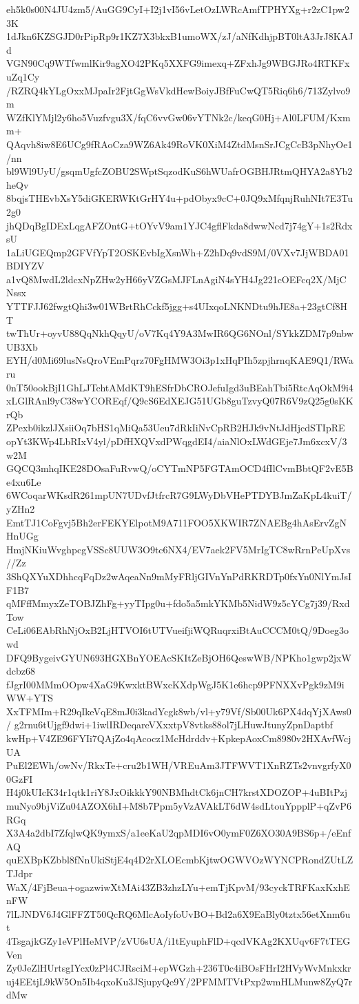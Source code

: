 eh5k0s00N4JU4zm5/AuGG9CyI+I2j1vI56vLetOzLWRcAmfTPHYXg+r2zC1pw23K
1dJkn6KZSGJD0rPipRp9r1KZ7X3bkxB1umoWX/zJ/aNfKdhjpBT0ltA3JrJ8KAJd
VGN90Cq9WTfwmlKir9agXO42PKq5XXFG9imexq+ZFxhJg9WBGJRo4RTKFxuZq1Cy
/RZRQ4kYLgOxxMJpaIr2FjtGgWsVkdHewBoiyJBfFuCwQT5Riq6h6/713Zylvo9m
WZfKlYMjl2y6ho5Vuzfvgu3X/fqC6vvGw06vYTNk2c/keqG0Hj+Al0LFUM/Kxmm+
QAqvh8iw8E6UCg9fRAoCza9WZ6Ak49RoVK0XiM4ZtdMsnSrJCgCcB3pNhyOe1/nn
bl9Wl9UyU/gsqmUgfcZOBU2SWptSqzodKuS6hWUafrOGBHJRtmQHYA2a8Yb2heQv
8bqjsTHEvbXsY5diGKERWKtGrHY4u+pdObyx9cC+0JQ9xMfqnjRuhNIt7E3Tu2g0
jhQDqBgIDExLqgAFZOntG+tOYvV9am1YJC4gflFkda8dwwNcd7j74gY+1s2RdxsU
1aLiUGEQmp2GFVfYpT2OSKEvbIgXsnWh+Z2hDq9vdS9M/0VXv7JjWBDA01BDIYZV
a1vQ8MwdL2ldcxNpZHw2yH66yVZGsMJFLnAgiN4sYH4Jg221cOEFcq2X/MjCNssx
YTTFJJ62fwgtQhi3w01WBrtRhCckf5jgg+s4UIxqoLNKNDtu9hJE8a+23gtCf8HT
twThUr+oyvU88QqNkhQqyU/oV7Kq4Y9A3MwIR6QG6NOnl/SYkkZDM7p9nbwUB3Xb
EYH/d0Mi69lusNsQroVEmPqrz70FgHMW3Oi3p1xHqPIh5zpjhrnqKAE9Q1/RWaru
0nT50ookBjI1GhLJTchtAMdKT9hESfrDbCROJefuIgd3uBEahTbi5RtcAqOkM9i4
xLGlRAnl9yC38wYCOREqf/Q9cS6EdXEJG51UGb8guTzvyQ07R6V9zQ25g0sKKrQb
ZPexb0ikzlJXsiiOq7bHS1qMiQa53Ueu7dRkIiNvCpRB2HJk9vNtJdHjcdSTIpRE
opYt3KWp4LbRIxV4yl/pDfHXQVxdPWqgdEI4/aiaNlOxLWdGEje7Jm6xcxV/3w2M
GQCQ3mhqIKE28DOsaFuRvwQ/oCYTmNP5FGTAmOCD4fIlCvmBbtQF2vE5Be4xu6Le
6WCoqarWKsdR261mpUN7UDvfJtfrcR7G9LWyDbVHePTDYBJmZaKpL4kuiT/yZHn2
EmtTJ1CoFgvj5Bh2erFEKYElpotM9A711FOO5XKWIR7ZNAEBg4hAsErvZgNHnUGg
HmjNKiuWvghpcgVSSc8UUW3O9tc6NX4/EV7aek2FV5MrIgTC8wRrnPeUpXvs//Zz
3ShQXYuXDhhcqFqDz2wAqeaNn9mMyFRljGIVnYnPdRKRDTp0fxYn0NlYmJsIF1B7
qMFffMmyxZeTOBJZhFg+yyTIpg0u+fdo5a5mkYKMb5NidW9z5cYCg7j39/RxdTow
CeLi06EAbRhNjOxB2LjHTVOI6tUTVueifjiWQRuqrxiBtAuCCCM0tQ/9Doeg3owd
DFQ9BygeivGYUN693HGXBnYOEAcSKItZeBjOH6QeswWB/NPKho1gwp2jxWdcbz68
fJgrI00MMmOOpw4XaG9KwxktBWxcKXdpWgJ5K1e6hcp9PFNXXvPgk9zM9iWW+YTS
XxTFMIm+R29qIkeVqE8mJ0i3kadYcgk8wb/vl+y79Vf/Sb00Uk6PX4dqYjXAws0/
g2rnu6tUjgf9dwi+1iwlIRDeqareVXxxtpV8vtks88ol7jLHuwJtunyZpnDaptbf
kwHp+V4ZE96FYIi7QAjZo4qAcocz1McHdrddv+KpkepAoxCm8980v2HXAvfWcjUA
PuEl2EWh/owNv/RkxTe+cru2b1WH/VREuAm3JTFWVT1XnRZTs2vnvgrfyX00GzFI
H4j0kUIcK34r1qtk1riY8JxOikkkY90NBMhdtCk6jnCH7krstXDOZOP+4uBItPzj
muNyo9bjViZu04AZOX6hI+M8b7Ppm5yVzAVAkLT6dW4sdLtouYppplP+qZvP6RGq
X3A4a2dbI7ZfqlwQK9ymxS/a1eeKaU2qpMDI6vO0ymF0Z6XO30A9BS6p+/eEnfAQ
quEXBpKZbbl8fNnUkiStjE4q4D2rXLOEcmbKjtwOGWVOzWYNCPRondZUtLZTJdpr
WaX/4FjBeua+ogazwiwXtMAi43ZB3zhzLYu+emTjKpvM/93cyckTRFKaxKxhEnFW
7lLJNDV6J4GlFFZT50QcRQ6MlcAoIyfoUvBO+Bd2a6X9EaBly0tztx56etXnm6ut
4TsgajkGZy1eVPlHeMVP/zVU6sUA/i1tEyuphFlD+qcdVKAg2KXUqv6F7tTEGVen
Zy0JeZlHUrtsgIYcx0zPl4CJRsciM+epWGzh+236T0c4iBOsFHrI2HVyWvMnkxkr
uj4EEtjL9kW5On5Ib4qxoKu3JSjupyQe9Y/2PFMMTVtPxp2wmHLMunw8ZyQ7rdMw
